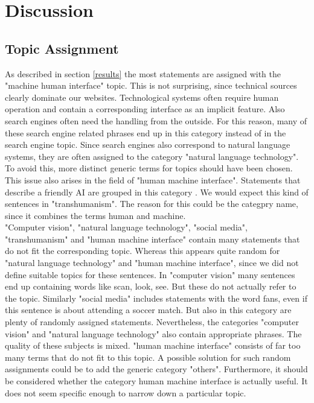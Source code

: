 \section{Discussion}

\subsection{Topic Assignment}
As described in section \ref{results} the most statements are assigned with the "machine human interface" topic.
This is not surprising, since technical sources clearly dominate our websites. 
Technological systems often require human operation and contain a corresponding interface as an implicit feature.
Also search engines often need the handling from the outside. 
For this reason, many of these search engine related phrases end up in this category instead of in the search engine topic.
Since search engines also correspond to natural language systems, they are often assigned to the category "natural language technology".
To avoid this, more distinct generic terms for topics should have been chosen.
This issue also arises in the field of "human machine interface". 
Statements that describe a friendly AI are grouped in this category . 
We would expect this kind of sentences in "transhumanism".
The reason for this could be the categpry name, since it combines the terms human and machine.
\\
"Computer vision", "natural language technology", "social media", "transhumanism" and "human machine interface" contain many statements that do not fit the corresponding topic.
Whereas this appears quite random for "natural language technology" and "human machine interface", since we did not define suitable topics for these sentences.
In "computer vision" many sentences end up containing words like scan, look, see.
But these do not actually refer to the topic.
Similarly "social media" includes  statements with the word fans, even if this sentence is about attending a soccer match.
But also in this category are plenty of randomly assigned statements.
Nevertheless, the categories "computer vision" and "natural language technology" also contain appropriate phrases.  
The quality of these subjects is mixed.
"human machine interface" consists of far too many terms that do not fit to this topic. 
A possible solution for such random assignments could be to add the generic category "others".
Furthermore, it should be considered whether the category human machine interface is actually useful.
It does not seem specific enough to narrow down a particular topic.
